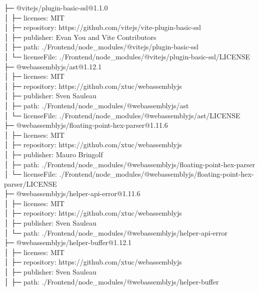 \documentclass[
    paper=a4,
    twoside=false,
    parskip=half,
    listof=entryprefix,
    listof=totoc,
    index=totoc,
    bibliography=totoc,
    headsepline,
]{scrbook}
\begin{document}
    ├─ @vitejs/plugin-basic-ssl@1.1.0\\
    │  ├─ licenses: MIT\\
    │  ├─ repository: https://github.com/vitejs/vite-plugin-basic-ssl\\
    │  ├─ publisher: Evan You and Vite Contributors\\
    │  ├─ path: ./Frontend/node\_modules/@vitejs/plugin-basic-ssl\\
    │  └─ licenseFile: ./Frontend/node\_modules/@vitejs/plugin-basic-ssl/LICENSE\\
    ├─ @webassemblyjs/ast@1.12.1\\
    │  ├─ licenses: MIT\\
    │  ├─ repository: https://github.com/xtuc/webassemblyjs\\
    │  ├─ publisher: Sven Sauleau\\
    │  ├─ path: ./Frontend/node\_modules/@webassemblyjs/ast\\
    │  └─ licenseFile: ./Frontend/node\_modules/@webassemblyjs/ast/LICENSE\\
    ├─ @webassemblyjs/floating-point-hex-parser@1.11.6\\
    │  ├─ licenses: MIT\\
    │  ├─ repository: https://github.com/xtuc/webassemblyjs\\
    │  ├─ publisher: Mauro Bringolf\\
    │  ├─ path: ./Frontend/node\_modules/@webassemblyjs/floating-point-hex-parser\\
    │  └─ licenseFile: ./Frontend/node\_modules/@webassemblyjs/floating-point-hex-parser/LICENSE\\
    ├─ @webassemblyjs/helper-api-error@1.11.6\\
    │  ├─ licenses: MIT\\
    │  ├─ repository: https://github.com/xtuc/webassemblyjs\\
    │  ├─ publisher: Sven Sauleau\\
    │  └─ path: ./Frontend/node\_modules/@webassemblyjs/helper-api-error\\
    ├─ @webassemblyjs/helper-buffer@1.12.1\\
    │  ├─ licenses: MIT\\
    │  ├─ repository: https://github.com/xtuc/webassemblyjs\\
    │  ├─ publisher: Sven Sauleau\\
    │  ├─ path: ./Frontend/node\_modules/@webassemblyjs/helper-buffer\\
\end{document}
